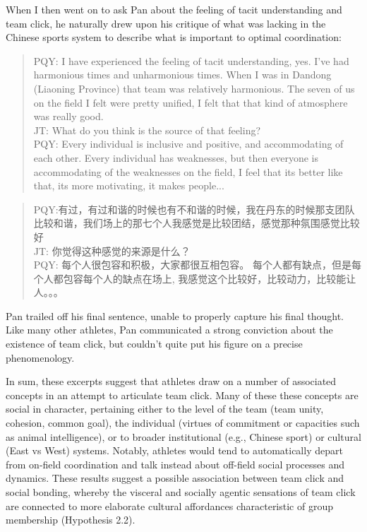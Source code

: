 \begin{CJK}{UTF8}{gbsn}
When I then went on to ask Pan about the feeling of tacit understanding and team click, he naturally drew upon his critique of what was lacking in the Chinese sports system to describe what is important to optimal coordination:

  \begin{quote}
    PQY: I have experienced the feeling of tacit understanding, yes. I've had harmonious times and unharmonious times. When I was in Dandong (Liaoning Province) that team was relatively harmonious.  The seven of us on the field I felt were pretty unified, I felt that that kind of atmosphere was really good. \\

    JT: What do you think is the source of that feeling? \\

    PQY: Every individual is inclusive and positive, and accommodating of each other. Every individual has weaknesses, but then everyone is accommodating of the weaknesses on the field, I feel that its better like that, its more motivating, it makes people...
  \end{quote}

  \begin{quote}
    PQY:有过，有过和谐的时候也有不和谐的时候，我在丹东的时候那支团队比较和谐，我们场上的那七个人我感觉是比较团结，感觉那种氛围感觉比较好 \\
    JT: 你觉得这种感觉的来源是什么？\\
    PQY: 每个人很包容和积极，大家都很互相包容。 每个人都有缺点，但是每个人都包容每个人的缺点在场上, 我感觉这个比较好，比较动力，比较能让人。。。
  \end{quote}

Pan trailed off his final sentence, unable to properly capture his final thought.  Like many other athletes, Pan communicated a strong conviction about the existence of team click, but couldn't quite put his figure on a precise phenomenology.


In sum, these excerpts suggest that athletes draw on a number of associated concepts in an attempt to articulate team click. Many of these these concepts are social in character, pertaining either to the level of the team (team unity, cohesion, common goal), the individual (virtues of commitment or capacities such as animal intelligence), or to broader institutional (e.g., Chinese sport) or cultural (East vs West) systems.  Notably, athletes would tend to automatically depart from on-field coordination and talk instead about off-field social processes and dynamics.  These results suggest a possible association between team click and social bonding, whereby the visceral and socially agentic sensations of team click are connected to more elaborate cultural affordances characteristic of group membership (Hypothesis 2.2).



\end{CJK}
